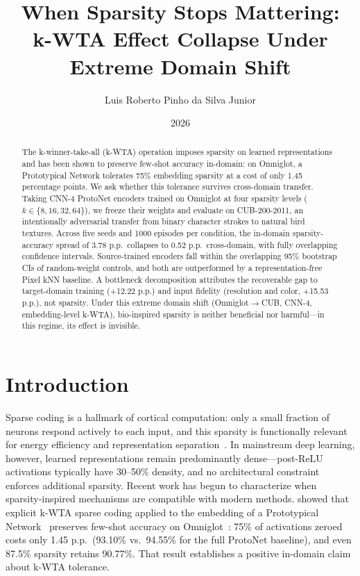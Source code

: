 \documentclass[11pt]{article}
\title{When Sparsity Stops Mattering:\\k-WTA Effect Collapse Under Extreme Domain Shift}
\author[1]{Luis Roberto Pinho da Silva Junior}
\affil[1]{Independent research \\ \url{https://github.com/luisroberto0/project-hebb}}
\date{2026}
\begin{document}
\maketitle

\begin{abstract}
The k-winner-take-all (k-WTA) operation imposes sparsity on learned representations and has been shown to preserve few-shot accuracy in-domain: on Omniglot, a Prototypical Network tolerates 75\% embedding sparsity at a cost of only 1.45 percentage points. We ask whether this tolerance survives cross-domain transfer. Taking CNN-4 ProtoNet encoders trained on Omniglot at four sparsity levels ($k \in \{8,16,32,64\}$), we freeze their weights and evaluate on CUB-200-2011, an intentionally adversarial transfer from binary character strokes to natural bird textures. Across five seeds and 1000 episodes per condition, the in-domain sparsity-accuracy spread of 3.78 p.p.\ collapses to 0.52 p.p.\ cross-domain, with fully overlapping confidence intervals. Source-trained encoders fall within the overlapping 95\% bootstrap CIs of random-weight controls, and both are outperformed by a representation-free Pixel kNN baseline. A bottleneck decomposition attributes the recoverable gap to target-domain training (+12.22 p.p.) and input fidelity (resolution and color, +15.53 p.p.), not sparsity. Under this extreme domain shift (Omniglot$\to$CUB, CNN-4, embedding-level k-WTA), bio-inspired sparsity is neither beneficial nor harmful---in this regime, its effect is invisible.
\end{abstract}

\section{Introduction}
\label{sec:intro}

Sparse coding is a hallmark of cortical computation: only a small fraction of neurons respond actively to each input, and this sparsity is functionally relevant for energy efficiency and representation separation~\citep{olshausen1996emergence,ahmad2019dense}. In mainstream deep learning, however, learned representations remain predominantly dense---post-ReLU activations typically have 30--50\% density, and no architectural constraint enforces additional sparsity. Recent work has begun to characterize when sparsity-inspired mechanisms are compatible with modern methods. \citet{pinho2026kwta} showed that explicit k-WTA sparse coding applied to the embedding of a Prototypical Network~\citep{snell2017prototypical} preserves few-shot accuracy on Omniglot~\citep{lake2015human}: 75\% of activations zeroed costs only 1.45 p.p.\ (93.10\% vs.\ 94.55\% for the full ProtoNet baseline), and even 87.5\% sparsity retains 90.77\%. That result establishes a positive in-domain claim about k-WTA tolerance.
\end{document}
